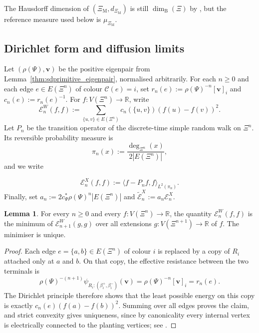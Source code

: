 \documentclass{article}
\theoremstyle{plain}
\theoremstyle{definition}
\newtheorem{lemma}[theorem]{Lemma}
\newcommand{\dimbox}{\dim_\mathrm{B}}
\begin{document}
The Hausdorff dimension of $(\Xi_{\mathrm M},d_{\Xi_{\mathrm M}})$ is still $\dimbox(\Xi)$ by \cite{neroli2024fractal}, but the reference measure used below is $\mu_{\Xi_{\mathrm M}}$.

\subsection{Dirichlet form and diffusion limits}\label{subsec:Dirichlet_form}

Let $(\rho(\Psi),\mathbf v)$ be the positive eigenpair from Lemma~\ref{thm:sdprimitive_eigenpair}, normalised arbitrarily.
For each $n\ge 0$ and each edge $e\in E(\Xi^n)$ of colour $\mathscr C(e)=i$, set $r_n(e):=\rho(\Psi)^{-n}[\mathbf v]_i$ and $c_n(e):=r_n(e)^{-1}$.
For $f:V(\Xi^n)\to\mathbb R$, write
\[
\mathcal E_n^{W}(f,f):=\sum_{\{u,v\}\in E(\Xi^n)} c_n(\{u,v\})(f(u)-f(v))^2.
\]
\begingroup\color{red}
Let $P_n$ be the transition operator of the discrete-time simple random
walk on $\Xi^n$. Its reversible probability measure is
\[
\pi_n(x):=\frac{\deg_{\Xi^n}(x)}{2|E(\Xi^n)|},
\]
and we write
\endgroup{}

\[
\mathcal E_n^{X}(f,f):=\langle f-P_nf,f\rangle_{L^2(\pi_n)}.
\]
Finally, set $a_n:=2c_\Psi^*\rho(\Psi)^n|E(\Xi^n)|$ and $\widetilde{\mathcal E}_n^{X}:=a_n\mathcal E_n^{X}$.

\begin{lemma}\label{lem:sec31_trace_weighted}
For every $n\ge 0$ and every $f:V(\Xi^n)\to\mathbb R$, the quantity $\mathcal E_n^{W}(f,f)$ is the minimum of $\mathcal E_{n+1}^{W}(g,g)$ over all extensions $g:V(\Xi^{n+1})\to\mathbb R$ of $f$.
The minimiser is unique.
\end{lemma}

\begin{proof}
Each edge $e=\{a,b\}\in E(\Xi^n)$ of colour $i$ is replaced by a copy of $R_i$ attached only at $a$ and $b$.
On that copy, the effective resistance between the two terminals is
\[
\rho(\Psi)^{-(n+1)}\psi_{R_i:(\beta_i^+,\beta_i^-)}(\mathbf v)
=
\rho(\Psi)^{-n}[\mathbf v]_i
=
r_n(e).
\]
The Dirichlet principle therefore shows that the least possible energy on this copy is exactly $c_n(e)(f(a)-f(b))^2$.
Summing over all edges proves the claim, and strict convexity gives uniqueness, since by canonicality every internal vertex is electrically connected to the planting vertices; see \cite{kigami2001analysis}.
\end{proof}
\end{document}
